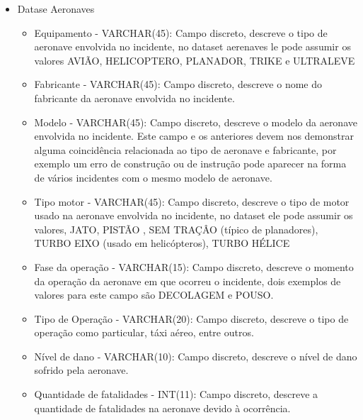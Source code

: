 \documentclass[conference]{IEEEtran}
\begin{document}
\begin{itemize}
 \item Datase Aeronaves
 
 \begin{itemize}
  \item Equipamento - VARCHAR(45): Campo discreto, descreve o tipo de aeronave envolvida no incidente, no dataset aerenaves le pode assumir os valores AVIÃO, HELICOPTERO, PLANADOR, TRIKE e ULTRALEVE
  \item Fabricante - VARCHAR(45): Campo discreto, descreve o nome do fabricante da aeronave envolvida no incidente. 
  \item Modelo - VARCHAR(45): Campo discreto, descreve o modelo da aeronave envolvida no incidente. Este campo e os anteriores devem nos demonstrar alguma coincidência relacionada
  ao tipo de aeronave e fabricante, por exemplo um erro de construção ou de instrução pode aparecer na forma de vários incidentes com o mesmo modelo de aeronave.
  \item Tipo motor - VARCHAR(45): Campo discreto, descreve o tipo de motor usado na aeronave envolvida no incidente, no dataset ele pode assumir os valores, JATO, PISTÃO
  , SEM TRAÇÂO (típico de planadores), TURBO EIXO (usado em helicópteros), TURBO HÉLICE
  \item Fase da operação - VARCHAR(15): Campo discreto, descreve o momento da operação da aeronave em que ocorreu o incidente, dois exemplos de valores para este campo são
  DECOLAGEM e POUSO.
  \item Tipo de Operação - VARCHAR(20): Campo discreto, descreve o tipo de operação como particular, táxi aéreo, entre outros.
  \item Nível de dano - VARCHAR(10): Campo discreto, descreve o nível de dano sofrido pela aeronave.
  \item Quantidade de fatalidades - INT(11): Campo discreto, descreve a quantidade de fatalidades na aeronave devido à ocorrência.\\ 
 \end{itemize}


\end{itemize}
\end{document}
